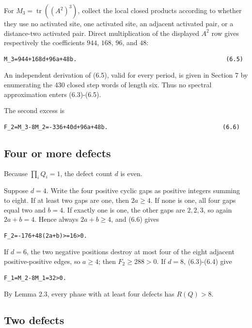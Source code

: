 For \(M_3=\operatorname{tr}((A^2)^3)\), collect the local closed products according to whether
they use no activated site, one activated site, an adjacent activated pair, or
a distance-two activated pair. Direct multiplication of the displayed
\(A^2\) row gives respectively the coefficients \(944\), \(168\), \(96\), and \(48\):

\begin{lstlisting}[language={}]
M_3=944+168d+96a+48b.                                           (6.5)
\end{lstlisting}

An independent derivation of (6.5), valid for every period, is given in
Section 7 by enumerating the 430 closed step words of length six. Thus no
spectral approximation enters (6.3)-(6.5).

The second excess is

\begin{lstlisting}[language={}]
F_2=M_3-8M_2=-336+40d+96a+48b.                                 (6.6)
\end{lstlisting}

\subsection{Four or more defects}

Because \(\prod_i Q_i=1\), the defect count \(d\) is even.

Suppose \(d=4\). Write the four positive cyclic gaps as positive integers
summing to eight. If at least two gaps are one, then \(2a\ge 4\). If none is one,
all four gaps equal two and \(b=4\). If exactly one is one, the other gaps are
\(2,2,3\), so again \(2a+b=4\). Hence always \(2a+b\ge 4\), and (6.6) gives

\begin{lstlisting}[language={}]
F_2=-176+48(2a+b)>=16>0.
\end{lstlisting}

If \(d=6\), the two negative positions destroy at most four of the eight
adjacent positive-positive edges, so \(a\ge 4\); then \(F_2\ge 288>0\). If \(d=8\),
(6.3)-(6.4) give

\begin{lstlisting}[language={}]
F_1=M_2-8M_1=32>0.
\end{lstlisting}

By Lemma 2.3, every phase with at least four defects has \(R(Q)>8\).

\subsection{Two defects}

